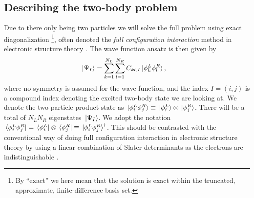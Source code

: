\documentclass[twocolumn,superscriptaddress,unsortedaddress,
 amsmath,amssymb,
 aps,
]{revtex4-2}
\begin{document}
    \subsection{Describing the two-body problem}
        Due to there only being two particles we will solve the full problem
        using exact diagonalization \footnote{
            By ``exact'' we here mean that the solution is exact within the
            truncated, approximate, finite-difference basis set.
        }, often denoted the \emph{full configuration interaction} method
        in electronic structure theory \cite{the-pink-book}.
        The wave function ansatz is then given by
        \begin{align*}
            \ket*{\Psi_I}
            &= \sum_{k = 1}^{N_L} \sum_{l = 1}^{N_R} C_{kl, I}
            \ket*{\phi^{L}_k \phi^{R}_l},
        \end{align*}
        where no symmetry is assumed for the wave function, and the index
        $I = (i, j)$ is a compound index denoting the excited two-body
        state we are looking at.
        We denote the two-particle product state as $\ket*{\phi^L_i \phi^R_j}
        \equiv \ket*{\phi^L_i} \otimes \ket*{\phi^R_j}$.
        There will be a total of $N_L N_R$ eigenstates $\ket*{\Psi_I}$.
        We adopt the notation $\bra*{\phi^L_i \phi^R_j}
        = \bra*{\phi^L_i} \otimes \bra*{\phi^R_j}
        \equiv \ket*{\phi^L_i \phi^R_j}^{\dagger}$.
        This should be contrasted with the conventional way of doing full
        configuration interaction in electronic structure theory by using
        a linear combination of Slater determinants as the electrons are
        indistinguishable \cite{the-pink-book}.
\end{document}
